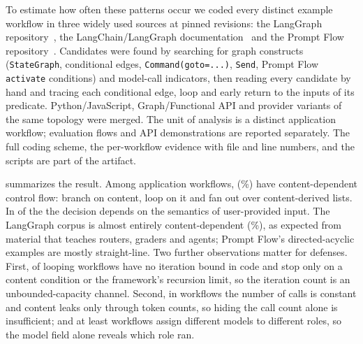 To estimate how often these patterns occur we coded every distinct example workflow in three widely used sources at pinned revisions: the LangGraph repository~\cite{langgraph2026}, the LangChain/LangGraph documentation~\cite{langchaindocs2026} and the Prompt Flow repository~\cite{promptflow2026}. Candidates were found by searching for graph constructs (\texttt{StateGraph}, conditional edges, \texttt{Command(goto=...)}, \texttt{Send}, Prompt Flow \texttt{activate} conditions) and model-call indicators, then reading every candidate by hand and tracing each conditional edge, loop and early return to the inputs of its predicate. Python/JavaScript, Graph/Functional API and provider variants of the same topology were merged. The unit of analysis is a distinct application workflow; evaluation flows and API demonstrations are reported separately. The full coding scheme, the per-workflow evidence with file and line numbers, and the scripts are part of the artifact.

 summarizes the result. Among \censusApps{} application workflows, \censusDependent{} (\censusPct\%) have content-dependent control flow: \censusBranching{} branch on content, \censusLoopsDep{} loop on it and \censusFanout{} fan out over content-derived lists. In \censusUserDriven{} of the \censusDependent{} the decision depends on the semantics of user-provided input. The LangGraph corpus is almost entirely content-dependent (\censusLangGraphPct\%), as expected from material that teaches routers, graders and agents; Prompt Flow's directed-acyclic examples are mostly straight-line. Two further observations matter for defenses. First, \censusUnbounded{} of \censusLoops{} looping workflows have no iteration bound in code and stop only on a content condition or the framework's recursion limit, so the iteration count is an unbounded-capacity channel. Second, in \censusConstantCalls{} workflows the number of calls is constant and content leaks only through token counts, so hiding the call count alone is insufficient; and at least \censusMultiModel{} workflows assign different models to different roles, so the model field alone reveals which role ran.


